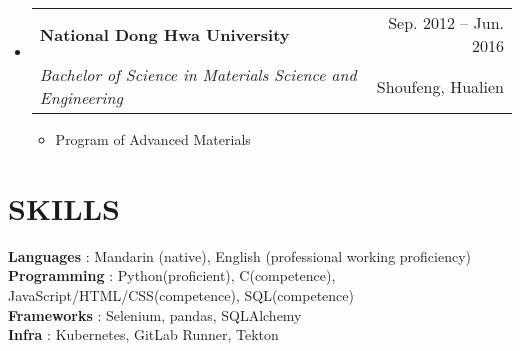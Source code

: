 \documentclass[letterpaper,11pt]{article}
\makeatletter
\newcommand{\resumeItem}[1]{
  \item\small{
    {#1 \vspace{-1pt}}
  }
}
\newcommand{\resumeSubheading}[4]{
  \vspace{-1pt}\item
    \begin{tabular*}{\textwidth}[t]{l@{\extracolsep{\fill}}r}
      \textbf{#1} & {\color{dark-grey}\small #2}\vspace{1pt}\\ %
      \textit{#3} & {\color{dark-grey} \small #4}\\ %
    \end{tabular*}\vspace{-4pt}
}
\newcommand{\resumeSubHeadingListStart}{\begin{itemize}[leftmargin=0in, label={}]}
\newcommand{\resumeSubHeadingListEnd}{\end{itemize}}
\newcommand{\resumeItemListStart}{\begin{itemize}}
\newcommand{\resumeItemListEnd}{\end{itemize}\vspace{0pt}}
\makeatother
\begin{document}
\resumeSubHeadingListStart
\resumeSubheading
  {National Dong Hwa University}{Sep. 2012 -- Jun. 2016}
  {Bachelor of Science in Materials Science and Engineering}{Shoufeng, Hualien}
    \resumeItemListStart
  \resumeItem {Program of Advanced Materials}

    \resumeItemListEnd
\resumeSubHeadingListEnd




%
\section{SKILLS}
 \begin{itemize}[leftmargin=0in, label={}]
    \small{\item{
     \textbf{Languages} {: Mandarin (native), English (professional working proficiency)}\vspace{2pt} \\
     \textbf{Programming} {: Python(proficient), C(competence), JavaScript/HTML/CSS(competence), SQL(competence)}\vspace{2pt} \\
     \textbf{Frameworks}     {: Selenium, pandas, SQLAlchemy} \\
     \textbf{Infra}     {: Kubernetes, GitLab Runner, Tekton}
    }}
 \end{itemize}


\end{document}
